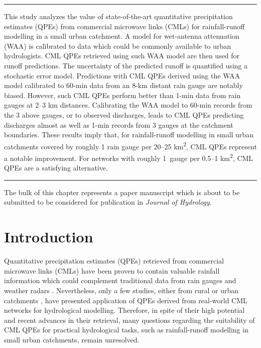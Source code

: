 \documentclass{ctuthesis}\usepackage[]{graphicx}\usepackage[]{color}
\begin{document}

\vspace*{-0.4cm}
\rule{\textwidth}{0.4pt}
This study analyzes the value of state-of-the-art quantitative precipitation estimates (QPEs) from commercial microwave links (CMLs) for rainfall-runoff modelling in a small urban catchment. A model for wet-antenna attenuation (WAA) is calibrated to data which could be commonly available to urban hydrologists. CML QPEs retrieved using such  WAA model are then used for runoff predictions. The uncertainty of the predicted runoff is quantified using a stochastic error model. Predictions with CML QPEs derived using the WAA model calibrated to 60-min data from an 8-km distant rain gauge are notably biased. However, such CML QPEs perform better than 1-min data from rain gauges at 2--3 km distances. Calibrating the WAA model to 60-min records from the 3 above gauges, or to observed discharges, leads to CML QPEs predicting discharges almost as well as 1-min records from 3 gauges at the catchment boundaries. These results imply that, for rainfall-runoff modelling in small urban catchments covered by roughly 1 rain gauge per 20--25 km\textsuperscript{2}, CML QPEs represent a notable improvement. For networks with roughly  1~gauge per 0.5--1 km\textsuperscript{2}, CML QPEs are  a satisfying alternative. 
\newline  \vspace*{-0.2cm}
\rule[0.2cm]{\textwidth}{0.4pt}
{\footnotesize The bulk of this chapter represents a paper manuscript which is about to be submitted to be considered for publication in \emph{Journal of Hydrology}. }

\vspace*{-0.3cm}


\section{Introduction}

Quantitative precipitation estimates (QPEs) retrieved from commercial microwave links (CMLs) have been proven to contain valuable rainfall information which could complement traditional data from rain gauges and weather radars \citep{chwalaCommercialMicrowaveLink2019, imhoffRainfallNowcastingUsing2020, riosgaonaRainfallRetrievalCommercial2018, uijlenhoetOpportunisticRemoteSensing2018}. Nevertheless, only a few studies, either from rural \citep{brauerEffectDifferencesRainfall2016, cazzanigaCalculatingHydrologicalResponse2020, smiatekPotentialCommercialMicrowave2017} or urban catchments \citep{dischImpactDifferentSources2019, pastorekCommercialMicrowaveLinks2019, stranskyRunoffPredictionUsing2018}, have presented application of QPEs derived from real-world CML networks for hydrological modelling. Therefore, in spite of their high potential and recent advances in their retrieval, many questions regarding the suitability of CML QPEs for practical hydrological tasks, such as rainfall-runoff modelling in small urban catchments, remain unresolved.
\end{document}
